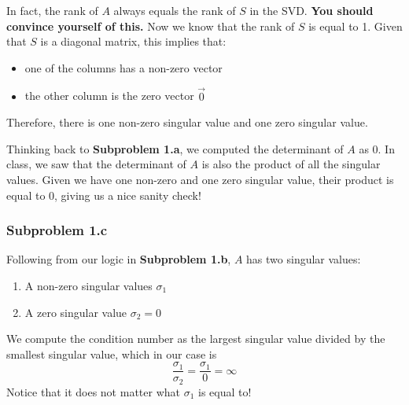 \documentclass[11pt]{article}
\begin{document}
In fact, the rank of $A$ always equals the rank of $S$ in the SVD. \textbf{You should convince yourself of this.} Now we know that the rank of $S$ is equal to 1. Given that $S$ is a diagonal matrix, this implies that:
\begin{itemize}
    \item one of the columns has a non-zero vector
    \item the other column is the zero vector $\vec{0}$
\end{itemize}
Therefore, there is one non-zero singular value and one zero singular value.

Thinking back to \textbf{Subproblem 1.a}, we computed the determinant of $A$ as 0. In class, we saw that the determinant of $A$ is also the product of all the singular values. Given we have one non-zero and one zero singular value, their product is equal to $0$, giving us a nice sanity check!

\subsubsection*{Subproblem 1.c}
Following from our logic in \textbf{Subproblem 1.b}, $A$ has two singular values:
\begin{enumerate}
    \item A non-zero singular values $\sigma_1$
    \item A zero singular value $\sigma_2=0$
\end{enumerate}
We compute the condition number as the largest singular value divided by the smallest singular value, which in our case is 
\[
\frac{\sigma_1}{\sigma_2}=\frac{\sigma_1}{0}=\infty
\]
Notice that it does not matter what $\sigma_1$ is equal to!
\end{document}
